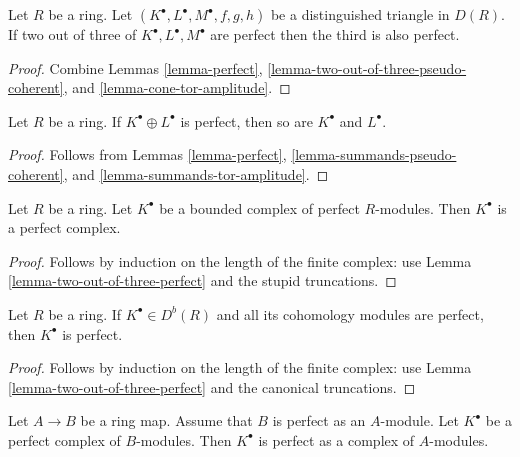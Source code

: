 \begin{lemma}
\label{lemma-two-out-of-three-perfect}
Let $R$ be a ring. Let $(K^\bullet, L^\bullet, M^\bullet, f, g, h)$
be a distinguished triangle in $D(R)$. If two out of three of
$K^\bullet, L^\bullet, M^\bullet$ are
perfect then the third is also perfect.
\end{lemma}

\begin{proof}
Combine
Lemmas \ref{lemma-perfect}, \ref{lemma-two-out-of-three-pseudo-coherent}, and
\ref{lemma-cone-tor-amplitude}.
\end{proof}

\begin{lemma}
\label{lemma-summands-perfect}
Let $R$ be a ring. If $K^\bullet \oplus L^\bullet$ is perfect, then
so are $K^\bullet$ and $L^\bullet$.
\end{lemma}

\begin{proof}
Follows from
Lemmas \ref{lemma-perfect}, \ref{lemma-summands-pseudo-coherent}, and
\ref{lemma-summands-tor-amplitude}.
\end{proof}

\begin{lemma}
\label{lemma-complex-perfect-modules}
Let $R$ be a ring. Let $K^\bullet$ be a bounded complex of perfect
$R$-modules. Then $K^\bullet$ is a perfect complex.
\end{lemma}

\begin{proof}
Follows by induction on the length of the finite complex: use
Lemma \ref{lemma-two-out-of-three-perfect}
and the stupid truncations.
\end{proof}

\begin{lemma}
\label{lemma-cohomology-perfect}
Let $R$ be a ring. If $K^\bullet \in D^b(R)$ and all its cohomology
modules are perfect, then $K^\bullet$ is perfect.
\end{lemma}

\begin{proof}
Follows by induction on the length of the finite complex: use
Lemma \ref{lemma-two-out-of-three-perfect}
and the canonical truncations.
\end{proof}

\begin{lemma}
\label{lemma-perfect-push-perfect}
Let $A \to B$ be a ring map. Assume that $B$ is perfect as
an $A$-module. Let $K^\bullet$ be a perfect complex of $B$-modules.
Then $K^\bullet$ is perfect as a complex of $A$-modules.
\end{lemma}

